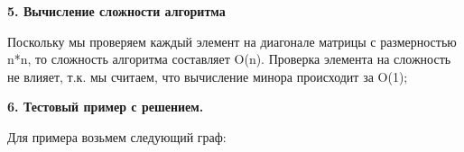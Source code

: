 \documentclass{article}
\begin{document}
\textbf{5. Вычисление сложности алгоритма} 
\begin{flushleft}
 	Поскольку мы проверяем каждый элемент на диагонале матрицы с размерностью n*n, то сложность алгоритма составляет O(n). Проверка элемента на сложность не влияет, т.к. мы считаем, что вычисление минора происходит за O(1);
	\vspace{3mm}
	\\
\end{flushleft}
\textbf{6. Тестовый пример с решением.} 
\begin{flushleft}
\par
    Для примера возьмем следующий граф:  \vspace{5mm}\\
\end{flushleft}
\end{document}
